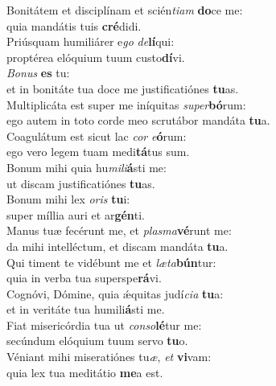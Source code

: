 \evenverse Bonitátem et disciplínam et scién\textit{ti}\textit{am} \textbf{do}ce me:~\*\\
\evenverse quia mandátis tuis \textbf{cré}didi.\\
\oddverse Priúsquam humiliárer e\textit{go} \textit{de}\textbf{lí}qui:~\*\\
\oddverse proptérea elóquium tuum custo\textbf{dí}vi.\\
\evenverse \textit{Bo}\textit{nus} \textbf{es} tu:~\*\\
\evenverse et in bonitáte tua doce me justificatiónes \textbf{tu}as.\\
\oddverse Multiplicáta est super me iníquitas \textit{su}\textit{per}\textbf{bó}rum:~\*\\
\oddverse ego autem in toto corde meo scrutábor mandáta \textbf{tu}a.\\
\evenverse Coagulátum est sicut lac \textit{cor} \textit{e}\textbf{ó}rum:~\*\\
\evenverse ego vero legem tuam medi\textbf{tá}tus sum.\\
\oddverse Bonum mihi quia hu\textit{mi}\textit{li}\textbf{á}sti me:~\*\\
\oddverse ut discam justificatiónes \textbf{tu}as.\\
\evenverse Bonum mihi lex \textit{o}\textit{ris} \textbf{tu}i:~\*\\
\evenverse super míllia auri et ar\textbf{gén}ti.\\
\oddverse Manus tuæ fecérunt me, et \textit{plas}\textit{ma}\textbf{vé}runt me:~\*\\
\oddverse da mihi intelléctum, et discam mandáta \textbf{tu}a.\\
\evenverse Qui timent te vidébunt me et \textit{læ}\textit{ta}\textbf{bún}tur:~\*\\
\evenverse quia in verba tua superspe\textbf{rá}vi.\\
\oddverse Cognóvi, Dómine, quia ǽquitas judí\textit{ci}\textit{a} \textbf{tu}a:~\*\\
\oddverse et in veritáte tua humili\textbf{á}sti me.\\
\evenverse Fiat misericórdia tua ut \textit{con}\textit{so}\textbf{lé}tur me:~\*\\
\evenverse secúndum elóquium tuum servo \textbf{tu}o.\\
\oddverse Véniant mihi miseratiónes tu\textit{æ}, \textit{et} \textbf{vi}vam:~\*\\
\oddverse quia lex tua meditátio \textbf{me}a est.\\

